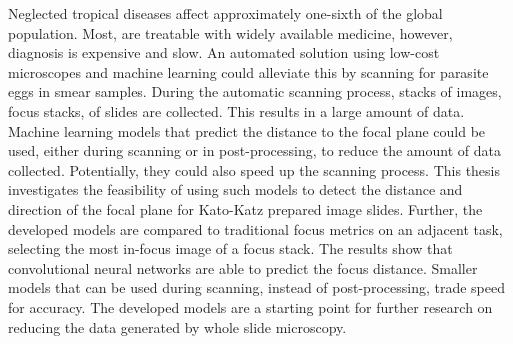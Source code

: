 Neglected tropical diseases affect approximately one-sixth of the global population. Most, are treatable with widely available medicine, however, diagnosis is expensive and slow. An automated solution using low-cost microscopes and machine learning could alleviate this by scanning for parasite eggs in smear samples. 
During the automatic scanning process, stacks of images, focus stacks, of slides are collected. This results in a large amount of data. Machine learning models that predict the distance to the focal plane could be used, either during scanning or in post-processing, to reduce the amount of data collected. Potentially, they could also speed up the scanning process. This thesis investigates the feasibility of using such models to detect the distance and direction of the focal plane for Kato-Katz prepared image slides. Further, the developed models are compared to traditional focus metrics on an adjacent task, selecting the most in-focus image of a focus stack. 
The results show that convolutional neural networks are able to predict the focus distance. Smaller models that can be used during scanning, instead of post-processing, trade speed for accuracy. The developed models are a starting point for further research on reducing the data generated by whole slide microscopy.
